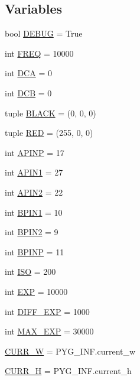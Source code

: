 \subsection*{Variables}
\begin{DoxyCompactItemize}
\item 
bool \hyperlink{namespacefocus_a95643fc1eae4f9b190d9e91d48185206}{D\+E\+B\+UG} = True
\item 
int \hyperlink{namespacefocus_a9f8a2660e7de2a492738e587878c2b7a}{F\+R\+EQ} = 10000
\item 
int \hyperlink{namespacefocus_aea3f9d81f82a645ab78f964477e8f30a}{D\+CA} = 0
\item 
int \hyperlink{namespacefocus_a7f3ad02c7918179b1964892572df8fc9}{D\+CB} = 0
\item 
tuple \hyperlink{namespacefocus_a87a409792b8a912c225495a99b855b51}{B\+L\+A\+CK} = (0, 0, 0)
\item 
tuple \hyperlink{namespacefocus_acc5e8b5ab47d18ad8776c429e3a3a4b7}{R\+ED} = (255, 0, 0)
\item 
int \hyperlink{namespacefocus_a358eaeffe0790a67619dfd820f2d66b5}{A\+P\+I\+NP} = 17
\item 
int \hyperlink{namespacefocus_a4b9a0e4629814a6b99bd65e3200fe3bd}{A\+P\+I\+N1} = 27
\item 
int \hyperlink{namespacefocus_aa7f17fd9c88f9bc5cf789df5cc73a20a}{A\+P\+I\+N2} = 22
\item 
int \hyperlink{namespacefocus_a9234861385a237ef6a50b00f5ab54f1c}{B\+P\+I\+N1} = 10
\item 
int \hyperlink{namespacefocus_ae83fcc832e2b5c6a0281655870eae658}{B\+P\+I\+N2} = 9
\item 
int \hyperlink{namespacefocus_a88336729338c9d4ef54e14f02f406c1b}{B\+P\+I\+NP} = 11
\item 
int \hyperlink{namespacefocus_ac7e622de99a123967bedbb1f5927ac40}{I\+SO} = 200
\item 
int \hyperlink{namespacefocus_a40e81481d1b661338eda552bc7dc5513}{E\+XP} = 10000
\item 
int \hyperlink{namespacefocus_af9cd2a2921f660052cb32a72a681c63e}{D\+I\+F\+F\+\_\+\+E\+XP} = 1000
\item 
int \hyperlink{namespacefocus_a3c4a2866356f68ceb6834b38951c16a0}{M\+A\+X\+\_\+\+E\+XP} = 30000
\item 
\hyperlink{namespacefocus_a2cf00646d7ebef8c88685295c224630e}{C\+U\+R\+R\+\_\+W} = P\+Y\+G\+\_\+\+I\+N\+F.\+current\+\_\+w
\item 
\hyperlink{namespacefocus_a577e326aeb1867de857503429538fca3}{C\+U\+R\+R\+\_\+H} = P\+Y\+G\+\_\+\+I\+N\+F.\+current\+\_\+h

\end{DoxyCompactItemize}
